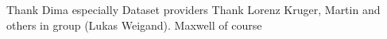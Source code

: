 Thank Dima especially
Dataset providers
Thank Lorenz Kruger, Martin and others in group (Lukas Weigand).
Maxwell of course